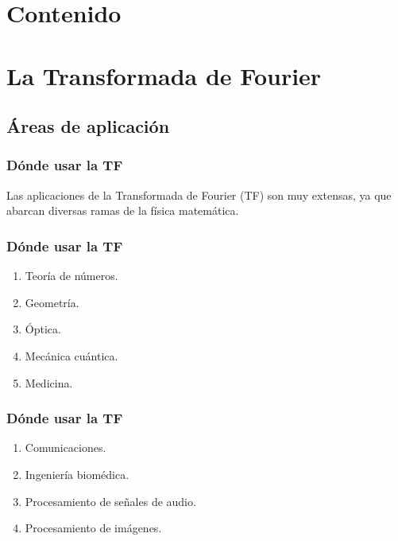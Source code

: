 \section*{Contenido}


\section{La Transformada de Fourier}
\subsection{Áreas de aplicación}

\begin{frame}
\frametitle{Dónde usar la TF}
Las aplicaciones de la Transformada de Fourier (TF) son muy extensas, ya que abarcan diversas ramas de la física matemática.
\end{frame}
\begin{frame}
\frametitle{Dónde usar la TF}
\begin{enumerate}[<+->]
\item Teoría de números.
\item Geometría.
\item Óptica.
\item Mecánica cuántica.
\item Medicina.
\seti
\end{enumerate}    
\end{frame}
\begin{frame}
\frametitle{Dónde usar la TF}
\begin{enumerate}[<+->]
\conti
\item Comunicaciones.
\item Ingeniería biomédica.
\item Procesamiento de señales de audio.
\item Procesamiento de imágenes.
\end{enumerate}    
\end{frame}
